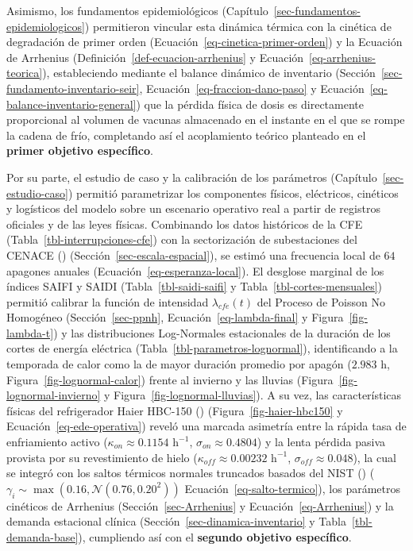 \documentclass[
  spanish,
  us-letterpaper,
]{scrreprt}
\numberwithin{equation}{section}
\theoremstyle{plain}
\theoremstyle{plain}
\theoremstyle{plain}
\theoremstyle{definition}
\theoremstyle{remark}
\begin{document}
Asimismo, los fundamentos epidemiológicos
(Capítulo~\ref{sec-fundamentos-epidemiologicos}) permitieron vincular
esta dinámica térmica con la cinética de degradación de primer orden
(Ecuación~\ref{eq-cinetica-primer-orden}) y la Ecuación de Arrhenius
(Definición~\ref{def-ecuacion-arrhenius} y
Ecuación~\ref{eq-arrhenius-teorica}), estableciendo mediante el balance
dinámico de inventario (Sección~\ref{sec-fundamento-inventario-seir},
Ecuación~\ref{eq-fraccion-dano-paso} y
Ecuación~\ref{eq-balance-inventario-general}) que la pérdida física de
dosis es directamente proporcional al volumen de vacunas almacenado en
el instante en el que se rompe la cadena de frío, completando así el
acoplamiento teórico planteado en el \textbf{primer objetivo
específico}.

Por su parte, el estudio de caso y la calibración de los parámetros
(Capítulo~\ref{sec-estudio-caso}) permitió parametrizar los componentes
físicos, eléctricos, cinéticos y logísticos del modelo sobre un
escenario operativo real a partir de registros oficiales y de las leyes
físicas. Combinando los datos históricos de la CFE
(Tabla~\ref{tbl-interrupciones-cfe}) con la sectorización de
subestaciones del CENACE () (Sección~\ref{sec-escala-espacial}), se estimó una
frecuencia local de \(64\) apagones anuales
(Ecuación~\ref{eq-esperanza-local}). El desglose marginal de los índices
SAIFI y SAIDI (Tabla~\ref{tbl-saidi-saifi} y
Tabla~\ref{tbl-cortes-mensuales}) permitió calibrar la función de
intensidad \(\lambda_{cfe}(t)\) del Proceso de Poisson No Homogéneo
(Sección~\ref{sec-ppnh}, Ecuación~\ref{eq-lambda-final} y
Figura~\ref{fig-lambda-t}) y las distribuciones Log-Normales
estacionales de la duración de los cortes de energía eléctrica
(Tabla~\ref{tbl-parametros-lognormal}), identificando a la temporada de
calor como la de mayor duración promedio por apagón (\(2.983\text{ h}\),
Figura~\ref{fig-lognormal-calor}) frente al invierno y las lluvias
(Figura~\ref{fig-lognormal-invierno} y
Figura~\ref{fig-lognormal-lluvias}). A su vez, las características
físicas del refrigerador Haier HBC-150
()
(Figura~\ref{fig-haier-hbc150} y Ecuación~\ref{eq-ede-operativa}) reveló
una marcada asimetría entre la rápida tasa de enfriamiento activo
(\(\kappa_{on} \approx 0.1154\text{ h}^{-1}\),
\(\sigma_{on} \approx 0.4804\)) y la lenta pérdida pasiva provista por
su revestimiento de hielo
(\(\kappa_{off} \approx 0.00232\text{ h}^{-1}\),
\(\sigma_{off} \approx 0.048\)), la cual se integró con los saltos
térmicos normales truncados basados del NIST
()
(\(\gamma_i \sim \max(0.16, \mathcal{N}(0.76, 0.20^2))\)
Ecuación~\ref{eq-salto-termico}), los parámetros cinéticos de Arrhenius
(Sección~\ref{sec-Arrhenius} y Ecuación~\ref{eq-Arrhenius}) y la demanda
estacional clínica (Sección~\ref{sec-dinamica-inventario} y
Tabla~\ref{tbl-demanda-base}), cumpliendo así con el \textbf{segundo
objetivo específico}.
\end{document}
